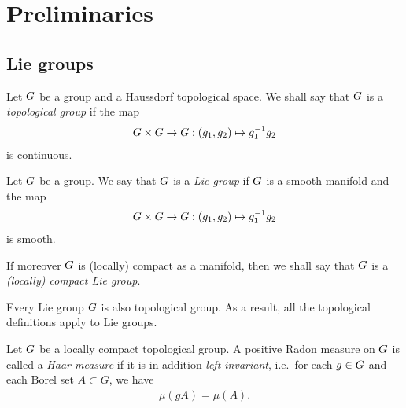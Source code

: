\chapter{Preliminaries}

\section{Lie groups}

\begin{definition}
\label{definition:topological_group}
    Let $G$ be a group and a Haussdorf topological space.
    We shall say that $G$ is a \emph{topological group} if the map
    \begin{align*}
        G \times G \to G :
        (g_1, g_2) \mapsto g_1^{-1} g_2
    \end{align*}
    is continuous.
\end{definition}

\begin{definition}
\label{definition:Lie_group}
    Let $G$ be a group.
    We say that $G$ is a \emph{Lie group}
    if $G$ is a smooth manifold and the map
    \begin{align*}
        G \times G \to G :
        (g_1, g_2) \mapsto g_1^{-1} g_2
    \end{align*}
    is smooth.

    If moreover $G$ is (locally) compact as a manifold,
    then we shall say that $G$ is a \emph{(locally) compact Lie group}.
\end{definition}

\begin{remark}
    Every Lie group $G$ is also topological group.
    As a result, all the topological definitions apply to Lie groups.
\end{remark}

\begin{definition}
    Let $G$ be a locally compact topological group.
    A positive Radon measure on $G$ is called a \emph{Haar measure}
    if it is in addition \emph{left-invariant},
    i.e.\ for each $g \in G$ and each Borel set $A \subset G$, we have
    \begin{align*}
        \mu(g A) = \mu(A).
    \end{align*}
\end{definition}


